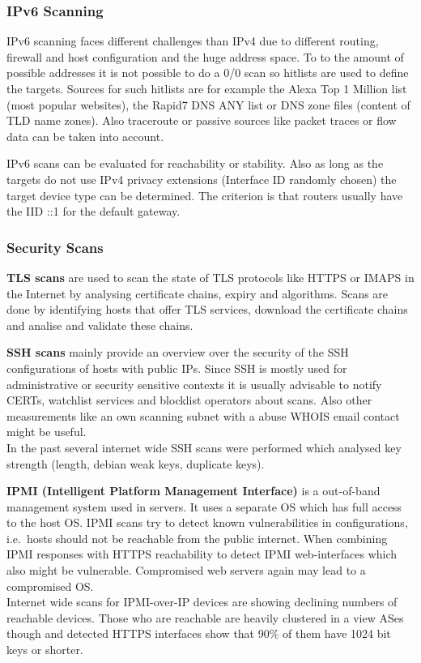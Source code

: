 \subsubsection*{IPv6 Scanning}
IPv6 scanning faces different challenges than IPv4 due to different routing, firewall and host configuration and the huge address space.
To to the amount of possible addresses it is not possible to do a 0/0 scan so hitlists are used to define the targets.
Sources for such hitlists are for example the Alexa Top 1 Million list (most popular websites), the Rapid7 DNS ANY list or DNS zone files (content of TLD name zones).
Also traceroute or passive sources like packet traces or flow data can be taken into account.\\
\vspace{4pt}

IPv6 scans can be evaluated for reachability or stability.
Also as long as the targets do not use IPv4 privacy extensions (Interface ID randomly chosen) the target device type can be determined.
The criterion is that routers usually have the IID ::1 for the default gateway.

\subsubsection*{Security Scans}
\textbf{TLS scans} are used to scan the state of TLS protocols like HTTPS or IMAPS in the Internet by analysing certificate chains, expiry and algorithms.
Scans are done by identifying hosts that offer TLS services, download the certificate chains and analise and validate these chains.\\
\vspace{4pt}

\textbf{SSH scans} mainly provide an overview over the security of the SSH configurations of hosts with public IPs.
Since SSH is mostly used for administrative or security sensitive contexts it is usually advisable to notify CERTs, watchlist services and blocklist operators about scans.
Also other measurements like an own scanning subnet with a abuse WHOIS email contact might be useful.\\
In the past several internet wide SSH scans were performed which analysed key strength (length, debian weak keys, duplicate keys).\\
\vspace{4pt}

\textbf{IPMI (Intelligent Platform Management Interface)} is a out-of-band management system used in servers.
It uses a separate OS which has full access to the host OS\@.
IPMI scans try to detect known vulnerabilities in configurations, i.e.\ hosts should not be reachable from the public internet.
When combining IPMI responses with HTTPS reachability to detect IPMI web-interfaces which also might be vulnerable.
Compromised web servers again may lead to a compromised OS.\\
Internet wide scans for IPMI-over-IP devices are showing declining numbers of reachable devices.
Those who are reachable are heavily clustered in a view ASes though and detected HTTPS interfaces show that 90\% of them have 1024 bit keys or shorter.\\

